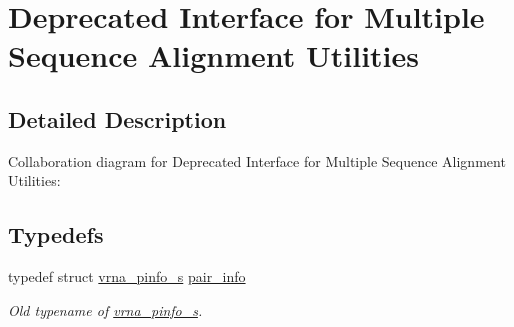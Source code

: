 \hypertarget{group__aln__utils__deprecated}{}\section{Deprecated Interface for Multiple Sequence Alignment Utilities}
\label{group__aln__utils__deprecated}


\subsection{Detailed Description}
Collaboration diagram for Deprecated Interface for Multiple Sequence Alignment Utilities\+:
\subsection*{Typedefs}
\begin{DoxyCompactItemize}
\item 
typedef struct \mbox{\hyperlink{group__aln__utils_structvrna__pinfo__s}{vrna\+\_\+pinfo\+\_\+s}} \mbox{\hyperlink{group__aln__utils__deprecated_ga7b61662a793ad0aa1ea38efc3a5baacc}{pair\+\_\+info}}
\begin{DoxyCompactList}\small\item\em Old typename of \mbox{\hyperlink{group__aln__utils_structvrna__pinfo__s}{vrna\+\_\+pinfo\+\_\+s}}. \end{DoxyCompactList}\end{DoxyCompactItemize}

